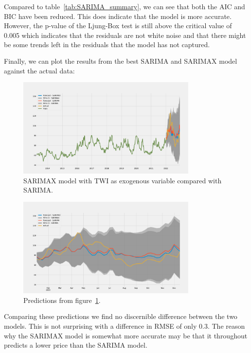 Compared to table~\ref{tab:SARIMA_summary}, we can see that both the AIC and BIC have been reduced. This does indicate that the model is more accurate. However, the p-value of the Ljung-Box test is still above the critical value of 0.005 which indicates that the residuals are not white noise and that there might be some trends left in the residuals that the model has not captured.

Finally, we can plot the results from the best SARIMA and SARIMAX model against the actual data:
\begin{figure}[H]
    \centering
    \includegraphics[width=0.8\textwidth]{data/Figures/ARIMA/SARIMA-SARIMAX.png}
    \caption[SARIMAX(2,1,0)(0,1,0,52)(TWI) compared with SARIMA.]{SARIMAX model with TWI as exogenous variable compared with SARIMA.}\label{fig:SARIMA-SARIMAX}
\end{figure}
\begin{figure}[H]
    \centering
    \includegraphics[width=0.8\textwidth]{data/Figures/ARIMA/SARIMA-SARIMAX_no_train.png}
    \caption{Predictions from figure~\ref{fig:SARIMA-SARIMAX}.}\label{fig:SARIMA-SARIMAX_no_train}
\end{figure}
Comparing these predictions we find no discernible difference between the two models. This is not surprising with a difference in RMSE of only 0.3. The reason why the SARIMAX model is somewhat more accurate may be that it throughout predicts a lower price than the SARIMA model.

